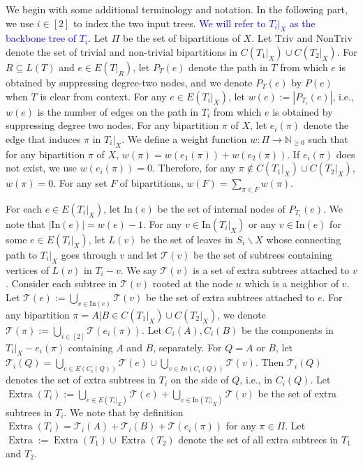 \documentclass[twocolumn]{bmcart}%
\newcommand{\In}{\mathrm{In}}
\newcommand{\triv}{\mathrm{Triv}}
\newcommand{\ntriv}{\mathrm{NonTriv}}
\DeclareMathOperator*{\extra}{Extra}
\theoremstyle{mystyle}
\theoremstyle{proofstyle}
\begin{document}
We begin with some additional terminology
and notation. 
In the following part, we use $i\in[2]$ to index the two input trees. 
\textcolor{blue}{
We will refer to $T_i|_X$ as the backbone tree of $T_i$. }
Let $\Pi$ be the set of bipartitions of $X$. Let $\triv$ and $\ntriv$ denote the set of trivial and non-trivial bipartitions in $C(T_1|_X) \cup C(T_2|_X)$.
For $R\subseteq L(T)$ and $e \in E(T|_R)$, let $P_T(e)$ denote the path in $T$ from which $e$ is obtained by suppressing degree-two nodes, and we denote $P_T(e)$ by $P(e)$ when $T$ is clear from context.
For any $e \in E(T_i|_X)$, let $w(e):= |P_{T_i}(e)|$, i.e., $w(e)$ is the number of edges on the path in $T_i$ from which $e$ is obtained by suppressing degree two nodes. 
For any bipartition $\pi$ of $X$, let $e_i(\pi)$ denote the edge that induces $\pi$ in $T_i|_X$. We define a weight function $w:\Pi \to \mathbb{N}_{\ge 0}$ such that for any bipartition $\pi$ of $X$, $w(\pi) = w(e_1(\pi)) + w(e_2(\pi))$. If $e_i(\pi)$ does not exist, we use $w(e_i(\pi)) = 0$. Therefore, for any $\pi \notin C(T_1|_X) \cup C(T_2|_X)$, $w(\pi) = 0$. For any set $F$ of bipartitions, $w(F) = \sum_{\pi \in F} w(\pi)$. 

For each $e \in E(T_i|_X)$, let $\In(e)$ be the set of internal nodes of $P_{T_i}(e)$. We note that $|\In(e)| = w(e)-1$. For any $v \in \In(T_i|_X)$ or any $v \in \In(e)$ for some $e \in E(T_i|_X)$, let $L(v)$ be the set of leaves in $S_i \backslash X$ whose connecting path to $T_i|_X$ goes through $v$ and let $\mathcal{T}(v)$ be the set of subtrees containing vertices of $L(v)$ in $T_i - v$. We say $\mathcal{T}(v)$ is a set of extra subtrees attached to $v$. Consider each subtree in $\mathcal{T}(v)$ rooted at the node $u$ which is a neighbor of $v$. Let $\mathcal{T}(e) := \bigcup_{v \in \In(e)} \mathcal{T}(v)$ be the set of extra subtrees attached to $e$. For any bipartition $\pi = A|B \in C(T_1|_X) \cup C(T_2|_X)$, we denote $\mathcal{T}(\pi) := \bigcup_{i \in [2]} \mathcal{T}(e_i(\pi))$. Let $C_i(A), C_i(B)$ be the components in $T_i|_X - e_i(\pi)$ containing $A$ and $B$, separately. For $Q = A$ or $B$, let $\mathcal{T}_i(Q) = \bigcup_{e \in E(C_i(Q))} \mathcal{T}(e) \cup \bigcup_{v \in In(C_i(Q))} \mathcal{T}(v)$. Then $\mathcal{T}_i(Q)$ denotes the set of extra subtrees in $T_i$ on the side of $Q$, i.e., in $C_i(Q)$. Let $\extra(T_i) := \bigcup_{e \in E(T_i|_X)} \mathcal{T}(e) + \bigcup_{v \in \In(T_i|_X)} \mathcal{T}(v)$ be the set of extra subtrees in $T_i$. We note that by definition $\extra(T_i) = \mathcal{T}_i(A) + \mathcal{T}_i(B) + \mathcal{T}(e_i(\pi))$ for any $\pi \in \Pi$. Let $\extra := \extra(T_1) \cup \extra(T_2)$ denote the set of all extra subtrees in $T_1$ and $T_2$.  
\end{document}
